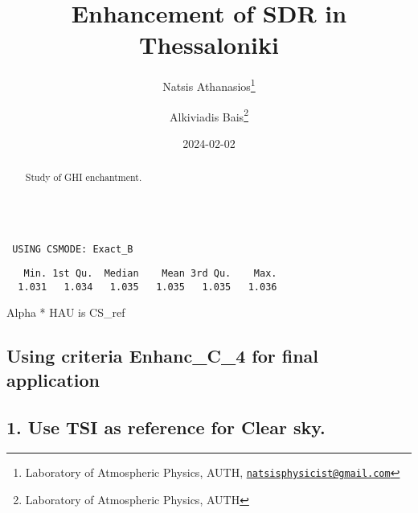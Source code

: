 \documentclass[
  10pt,
  a4paper,oneside]{article}
\title{Enhancement of SDR in Thessaloniki}
\author{Natsis Athanasios\footnote{Laboratory of Atmospheric Physics, AUTH, \href{mailto:natsisphysicist@gmail.com}{\nolinkurl{natsisphysicist@gmail.com}}} \and Alkiviadis Bais\footnote{Laboratory of Atmospheric Physics, AUTH}}
\date{2024-02-02}
\begin{document}
\maketitle
\begin{abstract}
Study of GHI enchantment.
\end{abstract}

{
\hypersetup{linkcolor=}
\setcounter{tocdepth}{4}
\tableofcontents
}
\begin{verbatim}

 USING CSMODE: Exact_B 
\end{verbatim}

\begin{verbatim}
   Min. 1st Qu.  Median    Mean 3rd Qu.    Max. 
  1.031   1.034   1.035   1.035   1.035   1.036 
\end{verbatim}

Alpha * HAU is CS\_ref

\hypertarget{using-criteria-enhanc_c_4-for-final-application}{%
\subsection{\texorpdfstring{Using criteria \textbf{Enhanc\_C\_4} for final application}{Using criteria Enhanc\_C\_4 for final application}}\label{using-criteria-enhanc_c_4-for-final-application}}

\hypertarget{use-tsi-as-reference-for-clear-sky.}{%
\subsection{1. Use TSI as reference for Clear sky.}\label{use-tsi-as-reference-for-clear-sky.}}
\end{document}
